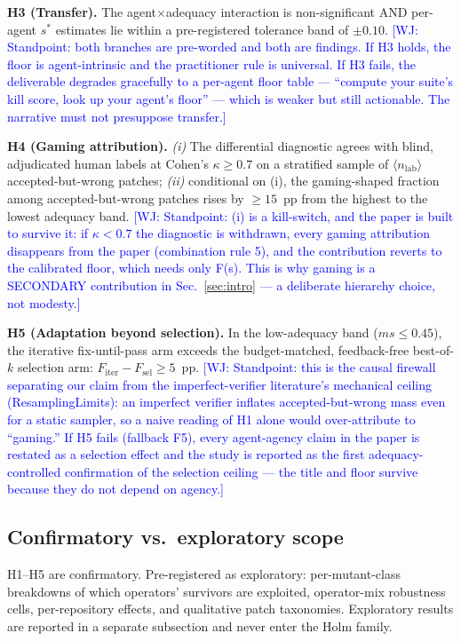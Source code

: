 \documentclass[conference]{IEEEtran}
\newcommand{\PH}[1]{\colorbox{gray!18}{\small$\langle$#1$\rangle$}}
\newcommand{\wj}[1]{\textcolor{blue}{\footnotesize [WJ: #1]}}
\newcommand{\ms}{\ensuremath{\mathit{ms}}}
\begin{document}
\medskip\noindent
\textbf{H3 (Transfer).} The agent$\times$adequacy interaction is
non-significant AND per-agent $s^\ast$ estimates lie within a
pre-registered tolerance band of $\pm 0.10$.
\wj{Standpoint: both branches are pre-worded and both are findings. If H3
holds, the floor is agent-intrinsic and the practitioner rule is
universal. If H3 fails, the deliverable degrades gracefully to a
per-agent floor table --- ``compute your suite's kill score, look up your
agent's floor'' --- which is weaker but still actionable. The narrative
must not presuppose transfer.}

\medskip\noindent
\textbf{H4 (Gaming attribution).} \emph{(i)} The differential diagnostic
agrees with blind, adjudicated human labels at Cohen's $\kappa \ge 0.7$
on a stratified sample of \PH{$n_{\mathrm{lab}}$} accepted-but-wrong
patches; \emph{(ii)} conditional on (i), the gaming-shaped fraction among
accepted-but-wrong patches rises by $\ge 15$~pp from the highest to the
lowest adequacy band.
\wj{Standpoint: (i) is a kill-switch, and the paper is built to survive
it: if $\kappa < 0.7$ the diagnostic is withdrawn, every gaming
attribution disappears from the paper (combination rule 5), and the
contribution reverts to the calibrated floor, which needs only F(s).
This is why gaming is a SECONDARY contribution in
Sec.~\ref{sec:intro} --- a deliberate hierarchy choice, not modesty.}

\medskip\noindent
\textbf{H5 (Adaptation beyond selection).} In the low-adequacy band
($\ms \le 0.45$), the iterative fix-until-pass arm exceeds the
budget-matched, feedback-free best-of-$k$ selection arm:
$F_{\mathrm{iter}} - F_{\mathrm{sel}} \ge 5$~pp.
\wj{Standpoint: this is the causal firewall separating our claim from
the imperfect-verifier literature's mechanical ceiling
(ResamplingLimits): an imperfect verifier inflates accepted-but-wrong
mass even for a static sampler, so a naive reading of H1 alone would
over-attribute to ``gaming.'' If H5 fails (fallback F5), every
agent-agency claim in the paper is restated as a selection effect and
the study is reported as the first adequacy-controlled confirmation of
the selection ceiling --- the title and floor survive because they do not
depend on agency.}

\subsection{Confirmatory vs.\ exploratory scope}
H1--H5 are confirmatory. Pre-registered as exploratory: per-mutant-class
breakdowns of which operators' survivors are exploited, operator-mix
robustness cells, per-repository effects, and qualitative patch
taxonomies. Exploratory results are reported in a separate subsection and
never enter the Holm family.
\end{document}
